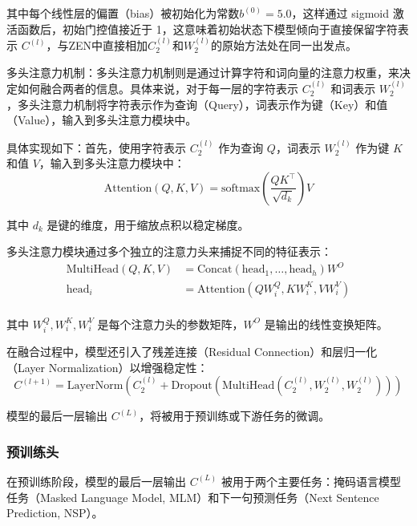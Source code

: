 \documentclass[12pt, a4paper]{ctexart}
\begin{document}
其中每个线性层的偏置（bias）被初始化为常数$b^{(0)} = 5.0$，这样通过 sigmoid 激活函数后，初始门控值接近于 1，这意味着初始状态下模型倾向于直接保留字符表示 $C^{(l)}$，与ZEN中直接相加$C^{(l)}_2$和$W^{(l)}_2$的原始方法处在同一出发点。

\vspace{2em} %

多头注意力机制：多头注意力机制则是通过计算字符和词向量的注意力权重，来决定如何融合两者的信息。具体来说，对于每一层的字符表示 $C^{(l)}_2$ 和词表示 $W^{(l)}_2$，多头注意力机制将字符表示作为查询（Query），词表示作为键（Key）和值（Value），输入到多头注意力模块中。

具体实现如下：首先，使用字符表示 $C^{(l)}_2$ 作为查询 $Q$，词表示 $W^{(l)}_2$ 作为键 $K$ 和值 $V$，输入到多头注意力模块中：
\begin{equation}
    \text{Attention}(Q, K, V) = \text{softmax}\left(\frac{QK^\top}{\sqrt{d_k}}\right)V
\end{equation}

其中 $d_k$ 是键的维度，用于缩放点积以稳定梯度。

多头注意力模块通过多个独立的注意力头来捕捉不同的特征表示：
\begin{equation}
    \begin{split}
        \text{MultiHead}(Q, K, V) &= \text{Concat}(\text{head}_1, \dots, \text{head}_h)W^O \\
        \text{head}_i &= \text{Attention}(QW_i^Q, KW_i^K, VW_i^V) \\
    \end{split}
\end{equation}

其中 $W_i^Q, W_i^K, W_i^V$ 是每个注意力头的参数矩阵，$W^O$ 是输出的线性变换矩阵。

在融合过程中，模型还引入了残差连接（Residual Connection）和层归一化（Layer Normalization）以增强稳定性：
\begin{equation}
    C^{(l+1)} = \text{LayerNorm}(C^{(l)}_2 + \text{Dropout}(\text{MultiHead}(C^{(l)}_2, W^{(l)}_2, W^{(l)}_2)))
\end{equation}

模型的最后一层输出 $C^{(L)}$，将被用于预训练或下游任务的微调。

\subsubsection{预训练头}
在预训练阶段，模型的最后一层输出 $C^{(L)}$ 被用于两个主要任务：掩码语言模型任务（Masked Language Model, MLM）和下一句预测任务（Next Sentence Prediction, NSP）。
\end{document}
